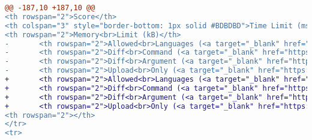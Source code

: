 \begin{lstlisting}[language=diff, basicstyle=\ttfamily, frame=single,
columns=fullflexible, keepspaces=true, breaklines=true]
@@ -187,10 +187,10 @@
<th rowspan="2">Score</th>
<th colspan="3" style="border-bottom: 1px solid #BDBDBD">Time Limit (ms)</th>
<th rowspan="2">Memory<br>Limit (kB)</th>
-       <th rowspan="2">Allowed<br>Languages (<a target="_blank" href="https://github.com/mjnaderi/Sharif-Judge/blob/docs/v1.4/add_assignment.md#allowed-languages">?</a>)</th>
-       <th rowspan="2">Diff<br>Command (<a target="_blank" href="https://github.com/mjnaderi/Sharif-Judge/blob/docs/v1.4/add_assignment.md#diff-command">?</a>)</th>
-       <th rowspan="2">Diff<br>Argument (<a target="_blank" href="https://github.com/mjnaderi/Sharif-Judge/blob/docs/v1.4/add_assignment.md#diff-arguments">?</a>)</th>
-       <th rowspan="2">Upload<br>Only (<a target="_blank" href="https://github.com/mjnaderi/Sharif-Judge/blob/docs/v1.4/add_assignment.md#upload-only">?</a>)</th>
+       <th rowspan="2">Allowed<br>Languages (<a target="_blank" href="https://github.com/ftisunpar/Sharif-Judge/blob/docs/v1.4/add_assignment.md#allowed-languages">?</a>)</th>
+       <th rowspan="2">Diff<br>Command (<a target="_blank" href="https://github.com/ftisunpar/Sharif-Judge/blob/docs/v1.4/add_assignment.md#diff-command">?</a>)</th>
+       <th rowspan="2">Diff<br>Argument (<a target="_blank" href="https://github.com/ftisunpar/Sharif-Judge/blob/docs/v1.4/add_assignment.md#diff-arguments">?</a>)</th>
+       <th rowspan="2">Upload<br>Only (<a target="_blank" href="https://github.com/ftisunpar/Sharif-Judge/blob/docs/v1.4/add_assignment.md#upload-only">?</a>)</th>
<th rowspan="2"></th>
</tr>
<tr>
\end{lstlisting}

